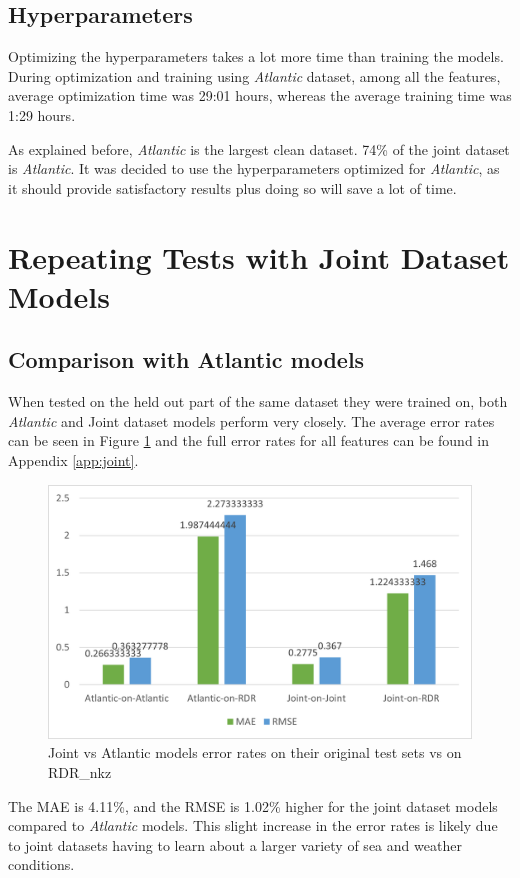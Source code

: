 \documentclass[12pt,twoside]{report}
\begin{document}
\subsection{Hyperparameters}
Optimizing the hyperparameters takes a lot more time than training the models. During optimization and training using \textit{Atlantic} dataset, among all the features, average optimization time was 29:01 hours, whereas the average training time was 1:29 hours.

As explained before, \textit{Atlantic} is the largest clean dataset. 74\% of the joint dataset is \textit{Atlantic}. It was decided to use the hyperparameters optimized for \textit{Atlantic}, as it should provide satisfactory results plus doing so will save a lot of time.

\section{Repeating Tests with Joint Dataset Models}

\subsection{Comparison with Atlantic models}
When tested on the held out part of the same dataset they were trained on, both \textit{Atlantic} and Joint dataset models perform very closely. The average error rates can be seen in Figure \ref{fig:joint-vs-atlantic} and the full error rates for all features can be found in Appendix \ref{app:joint}.

\begin{figure}[h]
\centering
\includegraphics[width = 0.7\hsize]{figures/joint-models/atlantic-vs-joint-on-RDR.png}
\caption{Joint vs Atlantic models error rates on their original test sets vs on RDR\_nkz}
\label{fig:joint-vs-atlantic}
\end{figure}

The MAE is 4.11\%, and the RMSE is 1.02\% higher for the joint dataset models compared to \textit{Atlantic} models. This slight increase in the error rates is likely due to joint datasets having to learn about a larger variety of sea and weather conditions.
\end{document}
